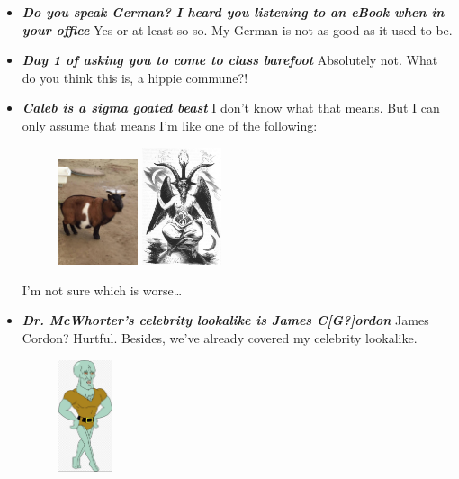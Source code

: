 \documentclass[11pt,letterpaper]{article}
\begin{document}
\begin{itemize}
\item {\bfseries\itshape Do you speak German? I heard you listening to an eBook when in your office} Yes or at least so-so. My German is not as good as it used to be. 

\item {\bfseries\itshape Day 1 of asking you to come to class barefoot} Absolutely not. What do you think this is, a hippie commune?! 

\item {\bfseries\itshape Caleb is a sigma goated beast} I don't know what that means. But I can only assume that means I'm like one of the following:
	\begin{figure}[H]
	\centering
	\includegraphics[width=0.22\textwidth]{images/goat.jpg}
	\includegraphics[width=0.22\textwidth]{images/baphomet.jpg}
	\end{figure}
I'm not sure which is worse\dots

\item {\bfseries\itshape Dr. McWhorter's celebrity lookalike is James C[G?]ordon} James Cordon? Hurtful. Besides, we've already covered my celebrity lookalike.
	\begin{figure}[H]
	\centering
	\includegraphics[width=0.15\textwidth]{images/handsomesquidward.jpg}
	\end{figure}
\end{itemize}
\end{document}
